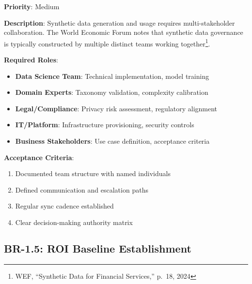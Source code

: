 \documentclass[12pt,a4paper,twoside]{report}
\begin{document}
\begin{tcolorbox}[colback=blue!5,colframe=blue!70,title=BR-1.4: Cross-Functional Team Organization]
\textbf{Priority}: Medium

\textbf{Description}: Synthetic data generation and usage requires multi-stakeholder
collaboration. The World Economic Forum notes that synthetic data governance is
typically constructed by multiple distinct teams working together\footnote{WEF,
``Synthetic Data for Financial Services,'' p.~18, 2024}.

\textbf{Required Roles}:
\begin{itemize}
\item \textbf{Data Science Team}: Technical implementation, model training
\item \textbf{Domain Experts}: Taxonomy validation, complexity calibration
\item \textbf{Legal/Compliance}: Privacy risk assessment, regulatory alignment
\item \textbf{IT/Platform}: Infrastructure provisioning, security controls
\item \textbf{Business Stakeholders}: Use case definition, acceptance criteria
\end{itemize}

\textbf{Acceptance Criteria}:
\begin{enumerate}
\item Documented team structure with named individuals
\item Defined communication and escalation paths
\item Regular sync cadence established
\item Clear decision-making authority matrix
\end{enumerate}
\end{tcolorbox}

\subsection{BR-1.5: ROI Baseline Establishment}
\end{document}
